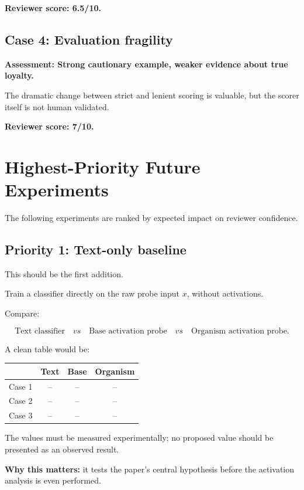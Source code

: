 \documentclass[11pt,a4paper]{article}
\begin{document}
\textbf{Reviewer score: 6.5/10.}

\subsection{Case 4: Evaluation fragility}

\textbf{Assessment: Strong cautionary example, weaker evidence about true loyalty.}

The dramatic change between strict and lenient scoring is valuable, but the scorer itself is not human validated.

\textbf{Reviewer score: 7/10.}

\section{Highest-Priority Future Experiments}

The following experiments are ranked by expected impact on reviewer confidence.

\subsection{Priority 1: Text-only baseline}

This should be the first addition.

Train a classifier directly on the raw probe input \(x\), without activations.

Compare:

\[
\text{Text classifier}
\quad vs \quad
\text{Base activation probe}
\quad vs \quad
\text{Organism activation probe}.
\]

A clean table would be:

\begin{center}
\begin{tabular}{lccc}
\toprule
& Text & Base & Organism\\
\midrule
Case 1 & -- & -- & --\\
Case 2 & -- & -- & --\\
Case 3 & -- & -- & --\\
\bottomrule
\end{tabular}
\end{center}

The values must be measured experimentally; no proposed value should be presented as an observed result.

\textbf{Why this matters:} it tests the paper's central hypothesis before the activation analysis is even performed.
\end{document}
